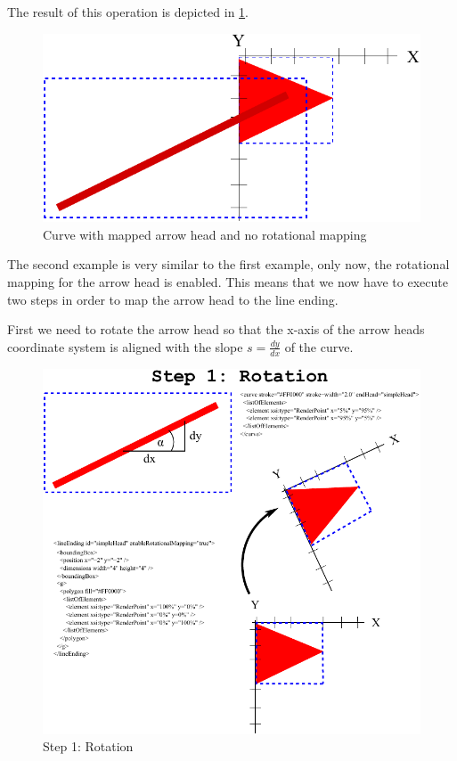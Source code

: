 The result of this operation is depicted in \ref{fig:3ArrowHeadMapping}.

\begin{figure}[!h]
\begin{center}
\includegraphics{figures/ArrowHeadMapping3.pdf}
\end{center}
\caption{Curve with mapped arrow head and no rotational mapping} \label{fig:3ArrowHeadMapping}
\end{figure}

The second example is very similar to the first example, only now, the rotational mapping for the arrow head is enabled.
This means that we now have to execute two steps in order to map the arrow head to the line ending.

First we need to rotate the arrow head so that the x-axis of the arrow heads coordinate system is aligned with the slope $s=\frac{dy}{dx}$ of the curve.

\begin{figure}[!h]
\begin{center}
\includegraphics{figures/ArrowHeadMapping6.pdf}
\end{center}
\caption{Step 1: Rotation}
\label{ArrowHeadMapping6}
\end{figure}

